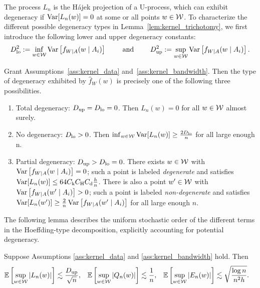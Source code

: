 The process $L_n$ is the H{\'a}jek projection of a U-process,
which can exhibit degeneracy if $\operatorname{Var}[L_n(w)] = 0$ at some
or all points $w \in \mathcal{W}$. To characterize the different possible
degeneracy types in Lemma~\ref{lem:kernel_trichotomy},
we first introduce the following lower and upper degeneracy constants:
%
\begin{align*}
  D_{\textup{lo}}^2 := \inf_{w \in \mathcal{W}} \operatorname{Var}\left[f_{W \mid A}(w \mid A_i)\right]
  \qquad \text{ and } \qquad
  D_{\textup{up}}^2 := \sup_{w \in \mathcal{W}} \operatorname{Var}\left[f_{W \mid A}(w \mid A_i)\right].
\end{align*}
%
\begin{lemma}%
  \label{lem:kernel_trichotomy}%
  Grant Assumptions~\ref{ass:kernel_data} and~\ref{ass:kernel_bandwidth}.
  Then the type of degeneracy exhibited by $\hat f_W(w)$
  is precisely one of the following three possibilities.
  \begin{enumerate}[label=(\roman*)]

    \item Total degeneracy:
      $D_{\textup{up}} = D_{\textup{lo}} = 0$. Then $L_n(w) = 0$ for all $w \in \mathcal{W}$ almost surely.

    \item No degeneracy:
      $D_{\textup{lo}} > 0$. Then $\inf_{w \in \mathcal{W}} \operatorname{Var}[L_n(w)] \geq \frac{2 D_{\textup{lo}}}{n}$
      for all large enough n.

    \item Partial degeneracy:
      $D_{\textup{up}} > D_{\textup{lo}} = 0$. There exists $w \in \mathcal{W}$ with
      $\operatorname{Var}\left[f_{W \mid A}(w \mid A_i)\right] = 0$;
      such a point is labeled \emph{degenerate} and satisfies
      $\operatorname{Var}[L_n(w)] \leq 64 C_{\mathrm{k}} C_{\mathrm{H}} C_{\mathrm{d}} \frac{h}{n}$.
      There is also a point $w' \in \mathcal{W}$ with
      $\operatorname{Var}\left[f_{W \mid A}(w' \mid A_i)\right] > 0$;
      such a point is labeled \emph{non-degenerate} and satisfies
      $\operatorname{Var}[L_n(w')] \geq
      \frac{2}{n} \operatorname{Var}\left[f_{W \mid A}(w' \mid A_i)\right]$
      for all large enough $n$.

  \end{enumerate}

\end{lemma}

The following lemma describes the uniform stochastic order of the different
terms in the Hoeffding-type decomposition, explicitly accounting for potential
degeneracy.

\begin{lemma}
  \label{lem:kernel_uniform_concentration}

  Suppose Assumptions \ref{ass:kernel_data} and
  \ref{ass:kernel_bandwidth} hold. Then
  \begin{align*}
    \mathbb{E}\left[ \sup_{w \in \mathcal{W}} |L_n(w)| \right]
    &\lesssim \frac{D_{\textup{up}}}{\sqrt n},
    &\mathbb{E}\left[ \sup_{w \in \mathcal{W}} |Q_n(w)| \right]
    &\lesssim \frac{1}{n},
    &\mathbb{E}\left[ \sup_{w \in \mathcal{W}} |E_n(w)| \right]
    &\lesssim \sqrt{\frac{\log n}{n^2h}}.
  \end{align*}
\end{lemma}


